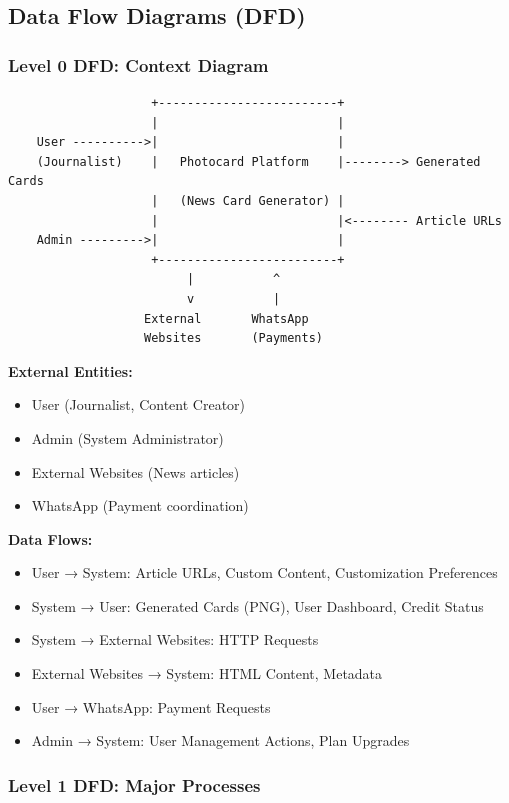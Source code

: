 \documentclass[12pt,a4paper]{article}
\begin{document}
\subsection{Data Flow Diagrams (DFD)}

\subsubsection{Level 0 DFD: Context Diagram}

\begin{verbatim}
                    +-------------------------+
                    |                         |
    User ---------->|                         |
    (Journalist)    |   Photocard Platform    |--------> Generated Cards
                    |   (News Card Generator) |
                    |                         |<-------- Article URLs
    Admin --------->|                         |
                    +-------------------------+
                         |           ^
                         v           |
                   External       WhatsApp
                   Websites       (Payments)
\end{verbatim}

\textbf{External Entities:}
\begin{itemize}
    \item User (Journalist, Content Creator)
    \item Admin (System Administrator)
    \item External Websites (News articles)
    \item WhatsApp (Payment coordination)
\end{itemize}

\textbf{Data Flows:}
\begin{itemize}
    \item User → System: Article URLs, Custom Content, Customization Preferences
    \item System → User: Generated Cards (PNG), User Dashboard, Credit Status
    \item System → External Websites: HTTP Requests
    \item External Websites → System: HTML Content, Metadata
    \item User → WhatsApp: Payment Requests
    \item Admin → System: User Management Actions, Plan Upgrades
\end{itemize}

\subsubsection{Level 1 DFD: Major Processes}
\end{document}
